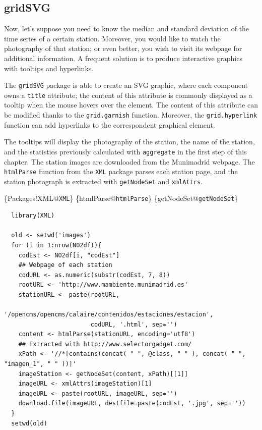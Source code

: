 \subsection{\floweroneleft gridSVG}
\label{sec:org669e15d}
Now, let's suppose you need to know the median and standard deviation
of the time series of a certain station. Moreover, you would like to
watch the photography of that station; or even better, you wish to visit
its webpage for additional information. A frequent solution is to
produce interactive graphics with tooltips and hyperlinks.

The \texttt{gridSVG} package is able to create an SVG graphic, where each
component owns a \texttt{title} attribute; the content of this attribute is
commonly displayed as a tooltip when the mouse hovers over the
element. The content of this attribute can be modified thanks to the
\texttt{grid.garnish} function. Moreover, the \texttt{grid.hyperlink} function can
add hyperlinks to the correspondent graphical element.

The tooltips will display the photography of the station, the name of
the station, and the statistics previously calculated with \texttt{aggregate}
in the first step of this chapter.  The station images are downloaded
from the Munimadrid webpage. The \texttt{htmlParse} function from the \texttt{XML}
package parses each station page, and the station photograph is
extracted with \texttt{getNodeSet} and \texttt{xmlAttrs}.

\begin{LaTeX}
\index\{Packages!XML@\texttt{XML}\}
\index\{htmlParse@\texttt{htmlParse}\}
\index\{getNodeSet@\texttt{getNodeSet}\}
\end{LaTeX}

\lstset{language=r,label= ,caption= ,captionpos=b,numbers=none}
\begin{lstlisting}
  library(XML)

  old <- setwd('images')
  for (i in 1:nrow(NO2df)){
    codEst <- NO2df[i, "codEst"]
    ## Webpage of each station
    codURL <- as.numeric(substr(codEst, 7, 8))
    rootURL <- 'http://www.mambiente.munimadrid.es'
    stationURL <- paste(rootURL,
                        '/opencms/opencms/calaire/contenidos/estaciones/estacion',
                        codURL, '.html', sep='')
    content <- htmlParse(stationURL, encoding='utf8')
    ## Extracted with http://www.selectorgadget.com/
    xPath <- '//*[contains(concat( " ", @class, " " ), concat( " ", "imagen_1", " " ))]'
    imageStation <- getNodeSet(content, xPath)[[1]]
    imageURL <- xmlAttrs(imageStation)[1]
    imageURL <- paste(rootURL, imageURL, sep='')
    download.file(imageURL, destfile=paste(codEst, '.jpg', sep=''))
  }
  setwd(old)
\end{lstlisting}

